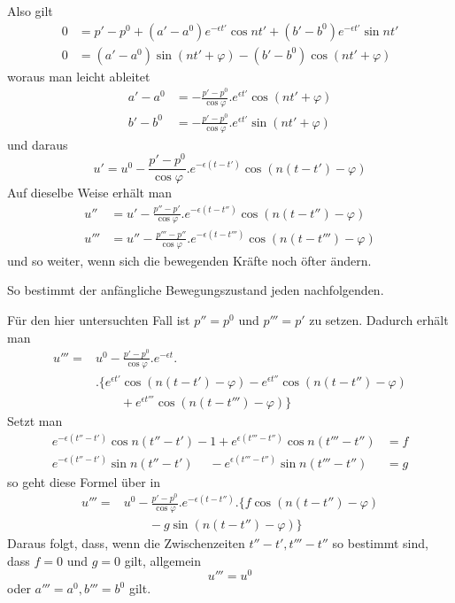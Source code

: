 Also gilt
\[
\begin{aligned}
0&=p'-p^0+(a'-a^0)e^{-\epsilon t'}\cos nt'+(b'-b^0)e^{-\epsilon t'}\sin nt'\\
0&=(a'-a^0)\sin(nt'+\varphi)-(b'-b^0)\cos(nt'+\varphi)
\end{aligned}
\]
woraus man leicht ableitet
\[
\begin{aligned}
a'-a^0&=-\frac{p'-p^0}{\cos\varphi}.e^{\epsilon t'}\cos(nt'+\varphi)\\
b'-b^0&=-\frac{p'-p^0}{\cos\varphi}.e^{\epsilon t'}\sin(nt'+\varphi)
\end{aligned}
\]
und daraus
\[
u'=u^0-\frac{p'-p^0}{\cos\varphi}.e^{-\epsilon(t-t')}\cos(n(t-t')-\varphi)
\]
Auf dieselbe Weise erhält man
\[
\begin{aligned}
u''&=u'-\frac{p''-p'}{\cos\varphi}.e^{-\epsilon(t-t'')}\cos(n(t-t'')-\varphi)\\
u'''&=u''-\frac{p'''-p''}{\cos\varphi}.e^{-\epsilon(t-t''')}\cos(n(t-t''')-\varphi)
\end{aligned}
\]
und so weiter, wenn sich die bewegenden Kräfte noch öfter ändern.

So bestimmt der anfängliche Bewegungszustand jeden nachfolgenden.

Für den hier untersuchten Fall ist $p''=p^0$ und $p'''=p'$ zu setzen. Dadurch erhält man
\[
\begin{aligned}
u'''={}&u^0-\frac{p'-p^0}{\cos\varphi}.e^{-\epsilon t}.\\
&.\{e^{\epsilon t'}\cos(n(t-t')-\varphi)-e^{\epsilon t''}\cos(n(t-t'')-\varphi)\\
&\qquad+e^{\epsilon t'''}\cos(n(t-t''')-\varphi)\}
\end{aligned}
\]
Setzt man
\[
\begin{aligned}
e^{-\epsilon(t''-t')}\cos n(t''-t')-1+e^{\epsilon(t'''-t'')}\cos n(t'''-t'')&=f\\
e^{-\epsilon(t''-t')}\sin n(t''-t')\phantom{-1}{}-e^{\epsilon(t'''-t'')}\sin n(t'''-t'')&=g
\end{aligned}
\]
so geht diese Formel über in
\[
\begin{aligned}
u'''={}&u^0-\frac{p'-p^0}{\cos\varphi}.e^{-\epsilon(t-t'')}.\{f\cos(n(t-t'')-\varphi)\\
&\qquad-g\sin(n(t-t'')-\varphi)\}
\end{aligned}
\]
Daraus folgt, dass, wenn die Zwischenzeiten $t''-t',t'''-t''$ so bestimmt sind, dass $f=0$ und $g=0$ gilt, allgemein
\[
u'''=u^0
\]
oder $a'''=a^0,b'''=b^0$ gilt.

